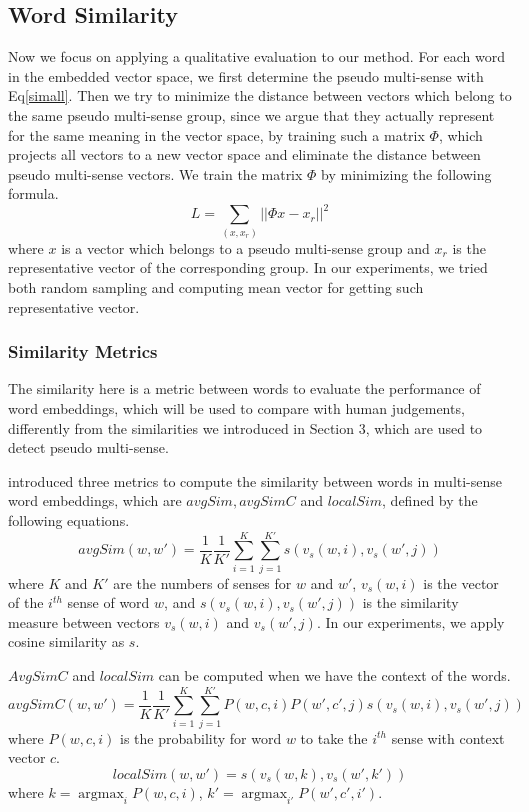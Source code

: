 \documentclass[11pt]{article}
\DeclareMathOperator*{\argmax}{argmax}
\begin{document}
\subsection{Word Similarity}
\par
Now we focus on applying a qualitative evaluation to our method. For each word in the embedded vector space, we first determine the pseudo multi-sense with Eq\eqref{simall}. Then we try to minimize the distance between vectors which belong to the same pseudo multi-sense group, since we argue that they actually represent for the same meaning in the vector space, by training such a matrix $\Phi$, which projects all vectors to a new vector space and eliminate the distance between pseudo multi-sense vectors. We train the matrix $\Phi$ by minimizing the following formula.
\begin{equation} \label{phi}
L = \sum_{(x,x_r)} ||\Phi x- x_r||^2
\end{equation}
where $x$ is a vector which belongs to a pseudo multi-sense group and $x_r$ is the representative vector of the corresponding group. In our experiments, we tried both random sampling and computing mean vector for getting such representative vector.
\subsubsection{Similarity Metrics}
The similarity here is a metric between words to evaluate the performance of word embeddings, which will be used to compare with human judgements, differently from the similarities we introduced in Section 3, which are used to detect pseudo multi-sense.
\par
{} introduced three metrics to compute the similarity between words in multi-sense word embeddings, which are $avgSim, avgSimC$ and $localSim$, defined by the following equations.
\begin{equation}
avgSim(w,w') = \frac1K \frac1{K'} \sum_{i=1}^K \sum_{j=1}^{K'} s(v_s(w,i), v_s(w',j))
\end{equation}
where $K$ and $K'$ are the numbers of senses for $w$ and $w'$, $v_s(w,i)$ is the vector of the $i^{th}$ sense of word $w$, and $s(v_s(w,i), v_s(w',j))$ is the similarity measure between vectors $v_s(w,i)$ and $v_s(w',j)$. In our experiments, we apply cosine similarity as $s$.
\par
$AvgSimC$ and $localSim$ can be computed when we have the context of the words.
\begin{equation}
avgSimC(w,w') = \frac1K \frac1{K'} \sum_{i=1}^K \sum_{j=1}^{K'} P(w,c,i)P(w',c',j) s(v_s(w,i), v_s(w',j))
\end{equation}
where $P(w,c,i)$ is the probability for word $w$ to take the $i^{th}$ sense with context vector $c$.
\\
\begin{equation}
localSim(w,w') = s(v_s(w,k), v_s(w',k'))
\end{equation}
where $k = \mathop{\argmax}_i P(w,c,i)$, $k' = \mathop{\argmax}_{i'} P(w',c',i')$.
\end{document}
